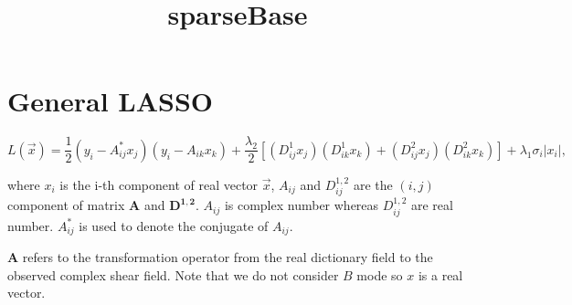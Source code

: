 \documentclass[11pt]{article}
\title{sparseBase}
\begin{document}
    
    
    \maketitle
    
    

    
    \hypertarget{general-lasso}{%
\section{General LASSO}\label{general-lasso}}

\[L(\vec{x})=\frac{1}{2}(y_{i}-A^{*}_{ij}x_{j})(y_{i}-A_{ik}x_{k})+\frac{\lambda_2}{2}[(D^{1}_{ij} x_{j})(D^{1}_{ik}x_{k})+ (D^{2}_{ij} x_{j})(D^{2}_{ik}x_{k})]+ \lambda_1 \sigma_i |x_i|,\]

where \(x_i\) is the i-th component of real vector \(\vec{x}\),
\(A_{ij}\) and \(D^{1,2}_{ij}\) are the \((i,j)\) component of matrix
\(\mathbf{A}\) and \(\mathbf{D^{1,2}}\). \(A_{ij}\) is complex number
whereas \(D^{1,2}_{ij}\) are real number. \(A^{*}_{ij}\) is used to
denote the conjugate of \(A_{ij}\).

\(\mathbf{A}\) refers to the transformation operator from the real
dictionary field to the observed complex shear field. Note that we do
not consider \(B\) mode so \(x\) is a real vector.
\end{document}
